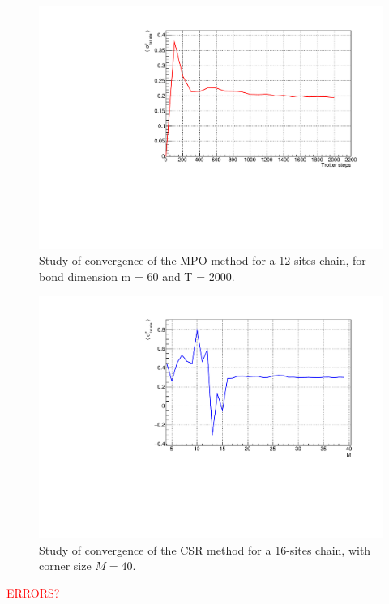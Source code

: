 \begin{figure}[H]
    \centering
    \includegraphics[scale=0.7]{Figures/12sites/ConvergenceLML012m060Time002000_J10505.pdf}
    \caption{Study of convergence of the MPO method for a 12-sites chain, for bond dimension m = 60 and T = 2000.}
    \label{fig:my_label}
\end{figure}

\begin{figure}[H]
    \centering
    \includegraphics[scale=0.7]{Figures/convergence/s16_M40J10505_Convergence.pdf}
    \caption{Study of convergence of the CSR method for a 16-sites chain, with corner size $M=40$.}
    \label{fig:my_label}
\end{figure}

\textcolor{red}{ERRORS?}


